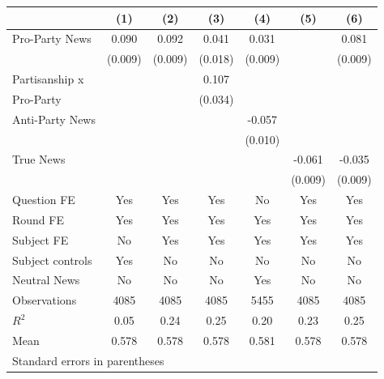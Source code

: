\begin{tabular}{l*{6}{c}}
\hline\hline
                    &\multicolumn{1}{c}{(1)}&\multicolumn{1}{c}{(2)}&\multicolumn{1}{c}{(3)}&\multicolumn{1}{c}{(4)}&\multicolumn{1}{c}{(5)}&\multicolumn{1}{c}{(6)}\\
\hline
Pro-Party News      &    0.090&    0.092&    0.041&    0.031&         &    0.081\\
                    &  (0.009)&  (0.009)&  (0.018)&  (0.009)&         &  (0.009)\\
Partisanship x      &         &         &    0.107&         &         &         \\
Pro-Party           &         &         &  (0.034)&         &         &         \\
Anti-Party News     &         &         &         &   -0.057&         &         \\
                    &         &         &         &  (0.010)&         &         \\
True News           &         &         &         &         &   -0.061&   -0.035\\
                    &         &         &         &         &  (0.009)&  (0.009)\\
Question FE         &      Yes&      Yes&      Yes&       No&      Yes&      Yes\\
Round FE            &      Yes&      Yes&      Yes&      Yes&      Yes&      Yes\\
Subject FE          &       No&      Yes&      Yes&      Yes&      Yes&      Yes\\
Subject controls    &      Yes&       No&       No&       No&       No&       No\\
Neutral News        &       No&       No&       No&      Yes&       No&       No\\
\hline
Observations        &     4085&     4085&     4085&     5455&     4085&     4085\\
\(R^{2}\)           &     0.05&     0.24&     0.25&     0.20&     0.23&     0.25\\
Mean                &    0.578&    0.578&    0.578&    0.581&    0.578&    0.578\\
\hline\hline
\multicolumn{7}{l}{\footnotesize Standard errors in parentheses}\\
\end{tabular}
